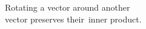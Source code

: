 \documentclass[preview]{standalone}
\begin{document}
\begin{center}
Rotating a vector around another\\ vector preserves their\
                    inner product.
\end{center}
\end{document}
